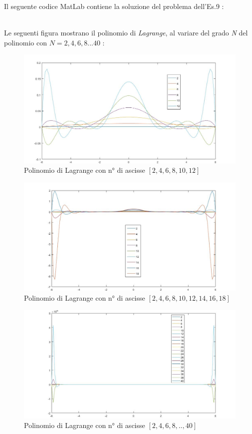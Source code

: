 Il seguente codice MatLab contiene la soluzione del problema dell'Es.9 :\\\
	
Le seguenti figura mostrano il polinomio di \textit{Lagrange}, al variare del grado \textit{N} del polinomio con $N=2,4,6,8...40$ :
	\begin{figure}[H]
		\label{Cap_4_Es_9_1}
		\includegraphics[width=\textwidth]{Plot/Cap_4_Es_9_1}
		\caption*{Polinomio di Lagrange con n° di ascisse $[2,4,6,8,10,12]$}
	\end{figure}
	\begin{figure}[H]
		\label{Cap_4_Es_9_2}
		\includegraphics[width=\textwidth]{Plot/Cap_4_Es_9_2}
		\caption*{Polinomio di Lagrange con n° di ascisse $[2,4,6,8,10,12,14,16,18]$}
	\end{figure}
	\begin{figure}[H]
		\label{Cap_4_Es_9_3}
		\includegraphics[width=\textwidth]{Plot/Cap_4_Es_9_3}
		\caption*{Polinomio di Lagrange con n° di ascisse $[2,4,6,8,..,40]$}
	\end{figure}
